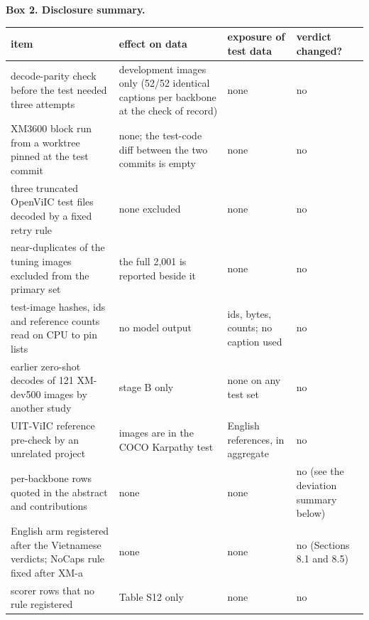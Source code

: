 \documentclass[manuscript,screen]{acmart}
\begin{document}
\textbf{Box 2. Disclosure summary.}

\begin{longtable}[]{@{}
  >{\raggedright\arraybackslash}p{}
  >{\raggedright\arraybackslash}p{}
  >{\raggedright\arraybackslash}p{}
  >{\raggedright\arraybackslash}p{}@{}}
\toprule\noalign{}
\begin{minipage}[b]{\linewidth}\raggedright
item
\end{minipage} & \begin{minipage}[b]{\linewidth}\raggedright
effect on data
\end{minipage} & \begin{minipage}[b]{\linewidth}\raggedright
exposure of test data
\end{minipage} & \begin{minipage}[b]{\linewidth}\raggedright
verdict changed?
\end{minipage} \\
\midrule\noalign{}
\endhead
\bottomrule\noalign{}
\endlastfoot
decode-parity check before the test needed three attempts & development images only (52/52 identical
captions per backbone at the check of record) & none & no \\
XM3600 block run from a worktree pinned at the test commit & none; the test-code diff between the
two commits is empty & none & no \\
three truncated OpenViIC test files decoded by a fixed retry rule & none excluded & none & no \\
60 near-duplicates of the tuning images excluded from the primary set & the full 2,001 is reported
beside it & none & no \\
test-image hashes, ids and reference counts read on CPU to pin lists & no model output & ids, bytes,
counts; no caption used & no \\
earlier zero-shot decodes of 121 XM-dev500 images by another study & stage B only & none on any test
set & no \\
UIT-ViIC reference pre-check by an unrelated project & 133 images are in the COCO Karpathy test &
English references, in aggregate & no \\
per-backbone rows quoted in the abstract and contributions & none & none & no (see the deviation
summary below) \\
English arm registered after the Vietnamese verdicts; NoCaps rule fixed after XM-a & none & none &
no (Sections 8.1 and 8.5) \\
scorer rows that no rule registered & Table S12 only & none & no \\
\end{longtable}
\end{document}
